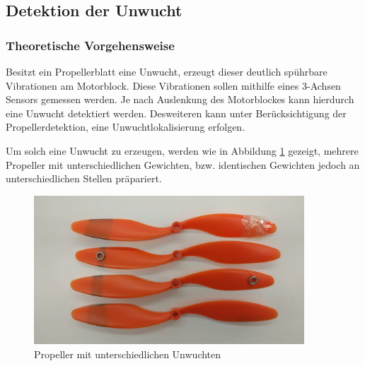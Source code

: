 \subsection{Detektion der Unwucht}

\subsubsection*{Theoretische Vorgehensweise}
Besitzt ein Propellerblatt eine Unwucht, erzeugt dieser deutlich spührbare Vibrationen am Motorblock.
Diese Vibrationen sollen mithilfe eines 3-Achsen Sensors gemessen werden.
Je nach Auslenkung des Motorblockes kann hierdurch eine Unwucht detektiert werden.
Desweiteren kann unter Berücksichtigung der Propellerdetektion, eine Unwuchtlokalisierung erfolgen. 

Um solch eine Unwucht zu erzeugen, werden wie in Abbildung \ref{fig:propeller-mit-unwucht} gezeigt, mehrere Propeller mit unterschiedlichen Gewichten, bzw. identischen Gewichten jedoch an unterschiedlichen Stellen präpariert.
\begin{figure}[H]
	\centering
	\includegraphics[width=0.9\textwidth]{images/chapter/03/propeller-mit-unwucht.png}
	\caption{Propeller mit unterschiedlichen Unwuchten}
	\label{fig:propeller-mit-unwucht}
\end{figure}

